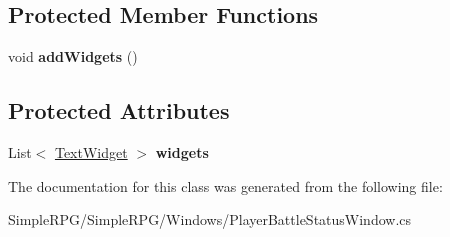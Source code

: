 \subsection*{Protected Member Functions}
\begin{DoxyCompactItemize}
\item 
\hypertarget{class_simple_r_p_g_1_1_windows_1_1_player_battle_status_window_a1403c2e6ef2166793aab5905dcab5f72}{void {\bfseries add\-Widgets} ()}\label{class_simple_r_p_g_1_1_windows_1_1_player_battle_status_window_a1403c2e6ef2166793aab5905dcab5f72}

\end{DoxyCompactItemize}
\subsection*{Protected Attributes}
\begin{DoxyCompactItemize}
\item 
\hypertarget{class_simple_r_p_g_1_1_windows_1_1_player_battle_status_window_a7a5099978d98539cc394564c2a16407b}{List$<$ \hyperlink{class_simple_r_p_g_1_1_widgets_1_1_text_widget}{Text\-Widget} $>$ {\bfseries widgets}}\label{class_simple_r_p_g_1_1_windows_1_1_player_battle_status_window_a7a5099978d98539cc394564c2a16407b}

\end{DoxyCompactItemize}


The documentation for this class was generated from the following file\-:\begin{DoxyCompactItemize}
\item 
Simple\-R\-P\-G/\-Simple\-R\-P\-G/\-Windows/Player\-Battle\-Status\-Window.\-cs\end{DoxyCompactItemize}
